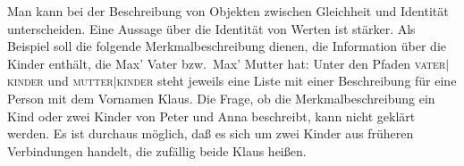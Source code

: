 Man kann bei der Beschreibung von Objekten zwischen Gleichheit und Identität
unterscheiden. Eine Aussage über die Identität von Werten ist stärker. Als
Beispiel soll die folgende Merkmalbeschreibung dienen, die Information
über die Kinder enthält, die Max' Vater bzw.\ Max' Mutter hat:
\ea
{}
\z
Unter den Pfaden \textsc{vater$|$kinder} und \textsc{mutter$|$kinder} steht jeweils
eine Liste mit einer Beschreibung für eine Person mit dem Vornamen Klaus.
Die Frage, ob die Merkmalbeschreibung ein Kind oder zwei Kinder von Peter und Anna
beschreibt, kann nicht geklärt werden. Es ist durchaus möglich,
daß es sich um zwei Kinder aus früheren Verbindungen handelt, die zufällig
beide Klaus heißen.

